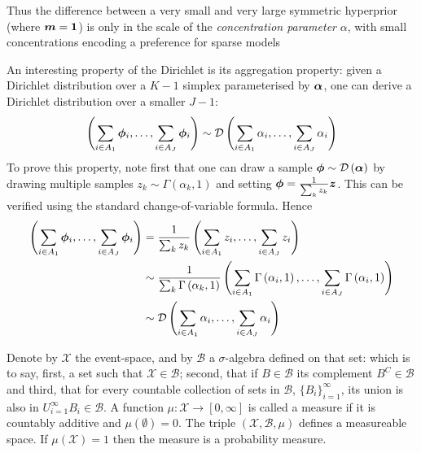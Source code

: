 Thus the difference between a very small and very large symmetric hyperprior (where $\bm m=\bm 1$) is only in the scale of the \emph{concentration parameter} $\alpha$, with small concentrations encoding a preference for sparse models

An interesting property of the Dirichlet is its aggregation property: given a Dirichlet distribution over a $K-1$ simplex parameterised by $\bm \alpha$, one can derive a Dirichlet distribution over a smaller $J-1$:
\begin{equation}
\left(
    \sum_{i \in A_1} { \bm \phi }_i, \ldots, \sum_{i \in A_J} { \bm \phi }_i
\right)
\sim
\mathcal{D} \left( {
    \sum_{i \in A_1} \alpha_i, \ldots, \sum_{i \in A_J} \alpha_i
} \right)
\end{equation}
To prove this property, note first that one can draw a sample ${ \bm \phi } \sim \mathcal{D} \left( {\bm \alpha} \right)$ by drawing multiple samples $z_k \sim \Gamma(\alpha_k, 1)$ and setting ${ \bm \phi } = \frac{1}{ {\sum_k z_k} } \bm z$. This can be verified using the standard change-of-variable formula. Hence
\begin{align}
\begin{split}
\left(
    \sum_{i \in A_1} { \bm \phi }_i, \ldots, \sum_{i \in A_J} { \bm \phi }_i 
\right)
& = 
\frac{1}{ {\sum_k z_k} }
\left(
    \sum_{i \in A_1} z_i, \ldots, \sum_{i \in A_J} z_i
\right) \\& \sim
\frac{1}{ {\sum_k \Gamma \left( {\alpha_k}, {1} \right)} }
\left(
    \sum_{i \in A_1} \Gamma \left( {\alpha_i}, {1} \right), \ldots, \sum_{i \in A_J} \Gamma \left( {\alpha_i}, {1} \right)
\right) \\
& \sim
\mathcal{D} \left( {
    \sum_{i \in A_1} \alpha_i, \ldots, \sum_{i \in A_J} \alpha_i
} \right)
\end{split}
\end{align}


\newcommand \eventspace { \mathcal{X}  }
\newcommand \sigalgebra { \mathcal{B}  }

Denote by $\eventspace$ the event-space, and by $\sigalgebra$ a $\sigma$-algebra defined on that set: which is to say, first, a set such that $\eventspace \in \sigalgebra$; second, that if $B \in \sigalgebra$ its complement $B^{C} \in \sigalgebra$ and third, that for every countable collection of sets in $\sigalgebra$, $\{ B_i \}_{i=1}^{\infty}$, its union is also in $U_{i=1}^{\infty} B_i \in \sigalgebra$. A function $\mu : \eventspace \rightarrow [0, \infty]$ is called a measure if it is countably additive and $\mu( \emptyset ) = 0$. The triple $(\eventspace, \sigalgebra, \mu)$ defines a measureable space. If $\mu(\eventspace) = 1$ then the measure is a probability measure.

